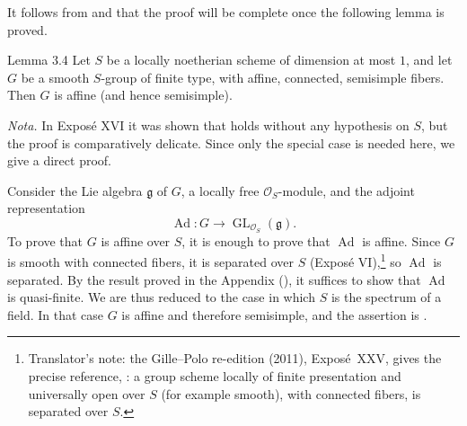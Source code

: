 It follows from  and  that the proof will be complete once the
following lemma is proved.

\begin{sgastatement}{Lemma 3.4}
Let \(S\) be a locally noetherian scheme of dimension at most \(1\),
and let \(G\) be a smooth \(S\)-group of finite type, with affine,
connected, semisimple fibers. Then \(G\) is affine (and hence
semisimple).
\end{sgastatement}

\noindent\textit{Nota.}\quad
In Exposé XVI it was shown that  holds without any hypothesis on
\(S\), but the proof is comparatively delicate. Since only the special
case  is needed here, we give a direct proof.

Consider the Lie algebra \(\mathfrak g\) of \(G\), a locally free
\(\mathcal O_S\)-module, and the adjoint representation
\[
 \operatorname{Ad}\colon
 G\longrightarrow\operatorname{GL}_{\mathcal O_S}(\mathfrak g).
\]
To prove that \(G\) is affine over \(S\), it is enough to prove that
\(\operatorname{Ad}\) is affine. Since \(G\) is smooth with connected
fibers, it is separated over \(S\) (Exposé VI),\footnote{Translator's note: the Gille--Polo re-edition (2011), Exposé~XXV, gives the precise
reference, : a group scheme locally of finite
presentation and universally open over \(S\) (for example smooth), with
connected fibers, is separated over \(S\).}
so \(\operatorname{Ad}\) is separated. By the result proved in the
Appendix (), it suffices to show that \(\operatorname{Ad}\) is
quasi-finite. We are thus reduced to the case in which \(S\) is the
spectrum of a field. In that case \(G\) is affine and therefore
semisimple, and the assertion is .
